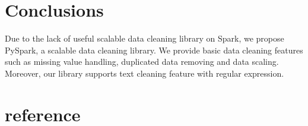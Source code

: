 \documentclass[sigconf]{acmart}
\begin{document}
\section{Conclusions}
Due to the lack of useful scalable data cleaning library on Spark, we propose PySpark, a scalable data cleaning library. We provide basic data cleaning features such as missing value handling, duplicated data removing and data scaling. Moreover, our library supports text cleaning feature with regular expression.

\section{reference}


\end{document}
